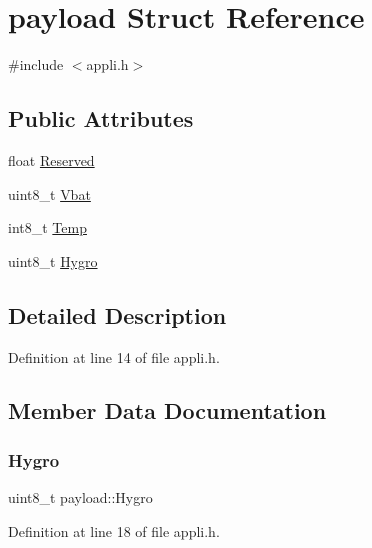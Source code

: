 \hypertarget{structpayload}{}\section{payload Struct Reference}
\label{structpayload}


{\ttfamily \#include $<$appli.\+h$>$}

\subsection*{Public Attributes}
\begin{DoxyCompactItemize}
\item 
float \mbox{\hyperlink{structpayload_a4fe84758224072d721d3b0573e75141f}{Reserved}}
\item 
uint8\+\_\+t \mbox{\hyperlink{structpayload_ada67d46f7c72f987d622511d30baeb11}{Vbat}}
\item 
int8\+\_\+t \mbox{\hyperlink{structpayload_a37cc36f378c70d3fd1aa1116588e380b}{Temp}}
\item 
uint8\+\_\+t \mbox{\hyperlink{structpayload_afc9c5cb383808537d084eef03c169977}{Hygro}}
\end{DoxyCompactItemize}


\subsection{Detailed Description}


Definition at line 14 of file appli.\+h.



\subsection{Member Data Documentation}
\mbox{\label{structpayload_afc9c5cb383808537d084eef03c169977}} 
\subsubsection{\texorpdfstring{Hygro}{Hygro}}
{\footnotesize\ttfamily uint8\+\_\+t payload\+::\+Hygro}



Definition at line 18 of file appli.\+h.

\mbox{\label{structpayload_a4fe84758224072d721d3b0573e75141f}} 
